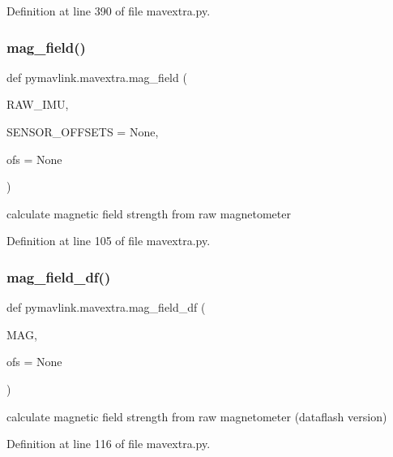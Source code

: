 Definition at line 390 of file mavextra.\+py.

\mbox{\label{namespacepymavlink_1_1mavextra_ae2c6b9c7ca47d69bc730cfc544c41b62}} 
\subsubsection{\texorpdfstring{mag\_field()}{mag\_field()}}
{\footnotesize\ttfamily def pymavlink.\+mavextra.\+mag\+\_\+field (\begin{DoxyParamCaption}\item[{}]{R\+A\+W\+\_\+\+I\+MU,  }\item[{}]{S\+E\+N\+S\+O\+R\+\_\+\+O\+F\+F\+S\+E\+TS = {\ttfamily None},  }\item[{}]{ofs = {\ttfamily None} }\end{DoxyParamCaption})}

\begin{DoxyVerb}calculate magnetic field strength from raw magnetometer\end{DoxyVerb}
 

Definition at line 105 of file mavextra.\+py.

\mbox{\label{namespacepymavlink_1_1mavextra_a4bdc6d85f92efa62d773a8609aabaa32}} 
\subsubsection{\texorpdfstring{mag\_field\_df()}{mag\_field\_df()}}
{\footnotesize\ttfamily def pymavlink.\+mavextra.\+mag\+\_\+field\+\_\+df (\begin{DoxyParamCaption}\item[{}]{M\+AG,  }\item[{}]{ofs = {\ttfamily None} }\end{DoxyParamCaption})}

\begin{DoxyVerb}calculate magnetic field strength from raw magnetometer (dataflash version)\end{DoxyVerb}
 

Definition at line 116 of file mavextra.\+py.

